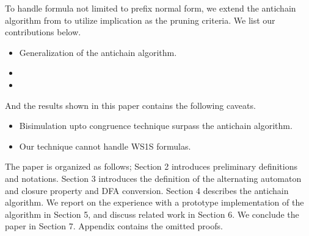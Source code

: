 To handle formula not limited to prefix normal form, we extend the antichain
algorithm from\cite{Wulf2006} to utilize implication as the pruning criteria. We
list our contributions below.

\begin{itemize}
\item Generalization of the antichain algorithm.
\item {}
\item {}
\end{itemize}

And the results shown in this paper contains the following caveats.
\begin{itemize}
\item Bisimulation upto congruence technique\cite{BonchiP13} surpass the antichain algorithm.
\item Our technique cannot handle WS1S formulas.
\end{itemize}

The paper is organized as follows; Section 2 introduces preliminary definitions
and notations. Section 3 introduces the definition of the alternating automaton
and closure property and DFA conversion. Section 4 describes the antichain
algorithm. We report on the experience with a prototype implementation of the
algorithm in Section 5, and discuss related work in Section 6. We conclude the
paper in Section 7. Appendix contains the omitted proofs.
